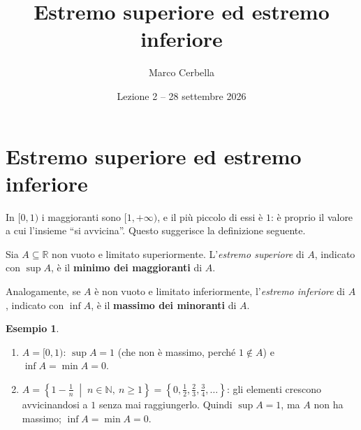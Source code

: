 \documentclass[11pt,a4paper]{article}
\title{Estremo superiore ed estremo inferiore}
\author{Marco Cerbella}
\date{Lezione 2 -- 28 settembre 2026}
\theoremstyle{definition}
\newtheorem*{esempio}{Esempio}
\begin{document}
\maketitle

\section{Estremo superiore ed estremo inferiore}

In $[0, 1)$ i maggioranti sono $[1, +\infty)$, e il più piccolo di essi è
$1$: è proprio il valore a cui l'insieme ``si avvicina''. Questo suggerisce
la definizione seguente.

\begin{definizione}
Sia $A \subseteq \mathbb{R}$ non vuoto e limitato superiormente.
L'\emph{estremo superiore} di $A$, indicato con $\sup A$, è il
\textbf{minimo dei maggioranti} di $A$.

Analogamente, se $A$ è non vuoto e limitato inferiormente, l'\emph{estremo
inferiore} di $A$, indicato con $\inf A$, è il \textbf{massimo dei
minoranti} di $A$.
\end{definizione}

\begin{center}
\end{center}

\begin{esempio}
\leavevmode
\begin{enumerate}
    \item $A = [0, 1)$: $\sup A = 1$ (che non è massimo, perché $1 \notin A$)
          e $\inf A = \min A = 0$.
    \item $A = \left\{ 1 - \frac{1}{n} \;\middle|\; n \in \mathbb{N},\
          n \geq 1 \right\} = \left\{ 0, \frac12, \frac23, \frac34, \dots
          \right\}$: gli elementi crescono avvicinandosi a $1$ senza mai
          raggiungerlo. Quindi $\sup A = 1$, ma $A$ non ha massimo;
          $\inf A = \min A = 0$.
\end{enumerate}
\end{esempio}
\end{document}

